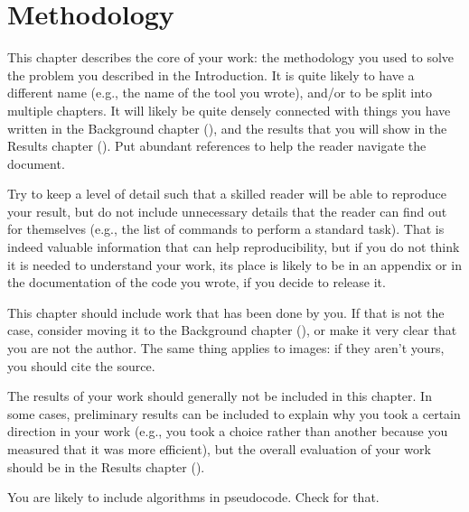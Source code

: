 \chapter{Methodology}\label{ch:method}

This chapter describes the core of your work: the methodology you used to solve the problem
you described in the Introduction. It is quite likely to have a different name (e.g., the
name of the tool you wrote), and/or to be split into multiple chapters. It will likely be quite
densely connected with things you have written in the Background chapter (),
and the results that you will show in the Results chapter (). Put abundant
references to help the reader navigate the document.

Try to keep a level of detail such that a skilled reader will be able to reproduce your result,
but do not include unnecessary details that the reader can find out for themselves (e.g., the
list of commands to perform a standard task). That is indeed valuable information that can help
reproducibility, but if you do not think it is needed to understand your work, its place is
likely to be in an appendix or in the documentation of the code you wrote, if you decide to
release it.

This chapter should include work that has been done by you. If that is not the case, consider
moving it to the Background chapter (), or make it very clear that you are
not the author. The same thing applies to images: if they aren't yours, you should cite the
source.

The results of your work should generally not be included in this chapter. In some cases,
preliminary results can be included to explain why you took a certain direction in your work
(e.g., you took a choice rather than another because you measured that it was more efficient),
but the overall evaluation of your work should be in the Results chapter ().

You are likely to include algorithms in pseudocode. Check
 for that.
